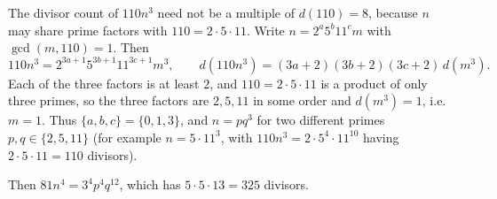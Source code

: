 The divisor count of $110n^3$ need not be a multiple of $d(110)=8$, because $n$ may share prime factors with $110=2\cdot5\cdot11$. Write $n=2^a5^b11^cm$ with $\gcd(m,110)=1$. Then
\[110n^3=2^{3a+1}5^{3b+1}11^{3c+1}m^3,\qquad d(110n^3)=(3a+2)(3b+2)(3c+2)\,d(m^3).\]
Each of the three factors is at least $2$, and $110=2\cdot5\cdot11$ is a product of only three primes, so the three factors are $2,5,11$ in some order and $d(m^3)=1$, i.e. $m=1$. Thus $\{a,b,c\}=\{0,1,3\}$, and $n=pq^3$ for two different primes $p,q\in\{2,5,11\}$ (for example $n=5\cdot11^3$, with $110n^3=2\cdot5^4\cdot11^{10}$ having $2\cdot5\cdot11=110$ divisors).

Then $81n^4=3^4p^4q^{12}$, which has $5\cdot5\cdot13=\boxed{325}$ divisors.
